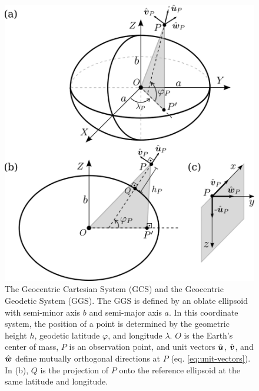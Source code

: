 \documentclass[extra]{gji}
\newcommand{\versor}[1]{\hat{\mitbf{#1}}}
\begin{document}
\begin{figure}
    \includegraphics{figures/cartesian-geodetic-systems.png}
    \caption{
    The Geocentric Cartesian System (GCS) and the Geocentric Geodetic System
    (GGS).
    The GGS is defined by an oblate ellipsoid with semi-minor axis $b$ and
    semi-major axis $a$.
    In this coordinate system, the position of a point is determined by the
    geometric height $h$, geodetic latitude $\varphi$, and longitude $\lambda$.
    $O$ is the Earth's center of mass, $P$ is an observation point, and
    unit vectors $\versor{u}$, $\versor{v}$, and $\versor{w}$ define mutually
    orthogonal directions at $P$ (eq. \ref{eq:unit-vectors}).
    In (b), $Q$ is the projection of $P$ onto the reference ellipsoid at
    the same latitude and longitude.
    }
  \label{fig:GCS-GGS}
\end{figure}
\end{document}
